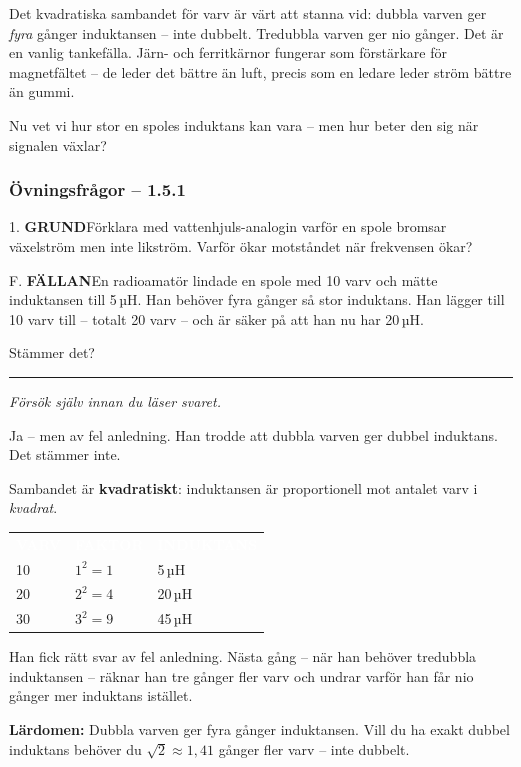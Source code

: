 \documentclass[a4paper,11pt,twoside]{book}
\newcommand{\tblhdr}[1]{\cellcolor{greydark}\textcolor{white}{\headingfont\bfseries\footnotesize\MakeUppercase{#1}}}
\newcommand{\qgrund}{\colorbox{greenpale}{\textcolor{greendark}{\headingfont\bfseries\tiny GRUND}}}
\newcommand{\qfallan}{\colorbox{ljusbrun}{\textcolor{kakao}{\headingfont\bfseries\tiny FÄLLAN}}}
\begin{document}
Det kvadratiska sambandet för varv är värt att stanna vid: dubbla varven ger \emph{fyra} gånger induktansen -- inte dubbelt. Tredubbla varven ger nio gånger. Det är en vanlig tankefälla. Järn- och ferritkärnor fungerar som förstärkare för magnetfältet -- de leder det bättre än luft, precis som en ledare leder ström bättre än gummi.

Nu vet vi hur stor en spoles induktans kan vara -- men 
hur beter den sig när signalen växlar?

\subsubsection*{Övningsfrågor -- 1.5.1}

\begin{qblock}{1.}
\qgrund\quad Förklara med vattenhjuls-analogin varför en 
spole bromsar växelström men inte likström. Varför ökar 
motståndet när frekvensen ökar?
\end{qblock}

\begin{qblock}{F.}
\qfallan\quad En radioamatör lindade en spole med 10 varv 
och mätte induktansen till 5\,µH. Han behöver fyra gånger 
så stor induktans. Han lägger till 10 varv till -- totalt 
20 varv -- och är säker på att han nu har 20\,µH. 

Stämmer det?
\end{qblock}

\medskip
\noindent\rule{\textwidth}{0.4pt}
{\small\itshape Försök själv innan du läser svaret.}
\medskip

\begin{worked}[title={Lösning -- Fallgropsfråga 1.5.1\,F}]
Ja -- men av fel anledning. Han trodde att dubbla varven 
ger dubbel induktans. Det stämmer inte.

Sambandet är \textbf{kvadratiskt}: induktansen är 
proportionell mot antalet varv i \emph{kvadrat}.

\begin{center}
\begin{tabular}{lll}
\rowcolor{greydark}
\tblhdr{Varv} & \tblhdr{Faktor} & \tblhdr{Induktans} \\
10 & $1^2 = 1$ & 5\,µH \\
\rowcolor{greylight}
20 & $2^2 = 4$ & 20\,µH \\
30 & $3^2 = 9$ & 45\,µH \\
\end{tabular}
\end{center}

Han fick rätt svar av fel anledning. Nästa gång -- när 
han behöver tredubbla induktansen -- räknar han tre 
gånger fler varv och undrar varför han får nio gånger 
mer induktans istället.

\textbf{Lärdomen:} Dubbla varven ger fyra gånger 
induktansen. Vill du ha exakt dubbel induktans behöver 
du $\sqrt{2} \approx 1{,}41$ gånger fler varv -- 
inte dubbelt.
\end{worked}
\end{document}
